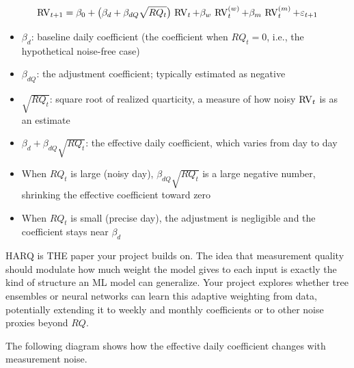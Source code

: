\begin{equation}
  \operatorname{RV}_{t+1} = \beta_0 + \bigl(\beta_d + \beta_{dQ}\sqrt{RQ_t}\bigr)\,\operatorname{RV}_t
             + \beta_w \, \operatorname{RV}^{(w)}_t + \beta_m \, \operatorname{RV}^{(m)}_t + \varepsilon_{t+1}
  \label{eq:harq}
\end{equation}
\begin{itemize}[nosep]
  \item $\beta_d$: baseline daily coefficient (the coefficient when $RQ_t = 0$, i.e., the hypothetical noise-free case)
  \item $\beta_{dQ}$: the adjustment coefficient; typically estimated as negative
  \item $\sqrt{RQ_t}$: square root of realized quarticity, a measure of how noisy $\operatorname{RV}_t$ is as an estimate
  \item $\beta_d + \beta_{dQ}\sqrt{RQ_t}$: the effective daily coefficient, which varies from day to day
  \item When $RQ_t$ is large (noisy day), $\beta_{dQ}\sqrt{RQ_t}$ is a large negative number, shrinking the effective coefficient toward zero
  \item When $RQ_t$ is small (precise day), the adjustment is negligible and the coefficient stays near $\beta_d$
\end{itemize}

\begin{projectconnection}
HARQ is THE paper your project builds on.
The idea that measurement quality should modulate how much weight the model gives to each input is exactly the kind of structure an ML model can generalize.
Your project explores whether tree ensembles or neural networks can learn this adaptive weighting from data, potentially extending it to weekly and monthly coefficients or to other noise proxies beyond $RQ$.
\end{projectconnection}

The following diagram shows how the effective daily coefficient changes with measurement noise.

